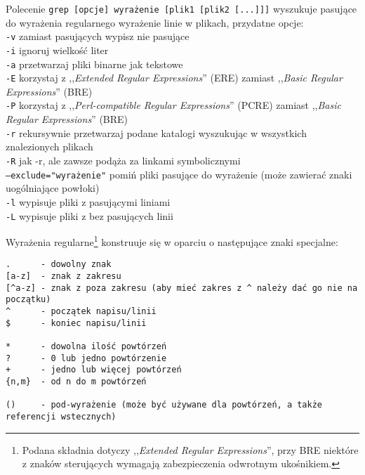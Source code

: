 \documentclass{pdfBooklets}
\begin{document}
Polecenie
\texttt{grep [opcje] wyrażenie [plik1 [plik2 [...]]]}
wyszukuje pasujące do wyrażenia regularnego wyrażenie linie w plikach, przydatne opcje:\\
	\texttt{-v} zamiast pasujących wypisz nie pasujące\\
	\texttt{-i} ignoruj wielkość liter\\
	\texttt{-a} przetwarzaj pliki binarne jak tekstowe\\
	\texttt{-E} korzystaj z ,,\emph{Extended Regular Expressions}'' (ERE) zamiast ,,\emph{Basic Regular Expressions}'' (BRE)\vspace{6pt}\\
	\texttt{-P} korzystaj z ,,\emph{Perl-compatible Regular Expressions}'' (PCRE) zamiast ,,\emph{Basic Regular Expressions}'' (BRE)\vspace{6pt}\\
	\texttt{-r} rekursywnie przetwarzaj podane katalogi wyszukując w wszystkich znalezionych plikach\\
	\texttt{-R} jak -r, ale zawsze podąża za linkami symbolicznymi\\
	\texttt{--exclude="wyrażenie"} pomiń pliki pasujące do wyrażenie (może zawierać znaki uogólniające powłoki)\vspace{6pt}\\
	\texttt{-l} wypisuje pliki z pasującymi liniami\\
	\texttt{-L} wypisuje pliki z bez pasujących linii

\vspace{13pt}\noindent Wyrażenia regularne\footnote{
	Podana składnia dotyczy ,,\emph{Extended Regular Expressions}'', przy BRE niektóre z znaków sterujących wymagają zabezpieczenia odwrotnym ukośnikiem.
} konstruuje się w oparciu o następujące znaki specjalne:
\vspace{-6pt}\begin{Verbatim}
.      - dowolny znak
[a-z]  - znak z zakresu
[^a-z] - znak z poza zakresu (aby mieć zakres z ^ należy dać go nie na początku)
^      - początek napisu/linii
$      - koniec napisu/linii

*      - dowolna ilość powtórzeń
?      - 0 lub jedno powtórzenie
+      - jedno lub więcej powtórzeń
{n,m}  - od n do m powtórzeń

()     - pod-wyrażenie (może być używane dla powtórzeń, a także referencji wstecznych)
\end{Verbatim}
\end{document}
